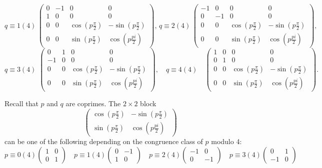 \documentclass[11pt]{amsart}
\theoremstyle{plain}
\theoremstyle{definition}
\theoremstyle{remark}
\begin{document}
  $$q\equiv 1(4) \, \left( \begin{matrix} 
  	0 & -1 & 0 & 0\\
  	1 & 0 &0 & 0\\
  	0 & 0 & \cos(p \frac{\pi}2) & -\sin(p\frac{\pi}2)\\
  	0 & 0 & \sin(p \frac{\pi}2) & \cos(p \frac{pi}2)
  \end{matrix}
  \right),\, q\equiv 2(4)\,\left( \begin{matrix} 
  	-1 & 0 & 0 & 0\\
  	0 & -1 & 0 & 0\\
  	0 & 0 & \cos(p \frac{\pi}2) & -\sin(p\frac{\pi}2)\\
  	0 & 0 & \sin(p \frac{\pi}2) & \cos(p \frac{pi}2)
  \end{matrix}
  \right),$$
  $$q\equiv 3(4) \, \,\left( \begin{matrix} 
  	0 & 1 & 0 & 0\\
  	-1 & 0 &0 & 0\\
  	0 & 0 & \cos(p \frac{\pi}2) & -\sin(p\frac{\pi}2)\\
  	0 & 0 & \sin(p \frac{\pi}2) & \cos(p \frac{pi}2)
  \end{matrix}
  \right), \quad q\equiv 4(4) \quad \left( \begin{matrix} 
  	1 & 0 & 0 & 0\\
  	0 & 1 &0 & 0\\
  	0 & 0 &  \cos(p \frac{\pi}2) & -\sin(p\frac{\pi}2)\\
  	0 & 0 & \sin(p \frac{\pi}2) & \cos(p \frac{pi}2)
  \end{matrix}
  \right). 
  $$
  
 Recall that  $p$ and $q$ are coprimes. The $2\times 2$ block
 $$\left( \begin{matrix}
 	 \cos(p \frac{\pi}2) & -\sin(p\frac{\pi}2)\\
 \sin(p \frac{\pi}2) & \cos(p \frac{pi}2)
 \end{matrix}
\right)$$
can be one of the following depending on the congruence class of $p$ modulo 4:
$$p\equiv 0(4) \left( \begin{matrix} 
	1 & 0 \\
	0 & 1 \end{matrix}\right)\quad p\equiv 1(4) \left( \begin{matrix} 
	0 & -1 \\
	1 & 0 \end{matrix}\right)\quad p\equiv 2(4) \left( \begin{matrix} 
	-1 & 0 \\
	0 & -1\end{matrix}\right)
  \quad p\equiv 3(4) \left( \begin{matrix} 
  0 & 1 \\
  	-1 &0 \end{matrix}\right)$$
  
\end{document}
